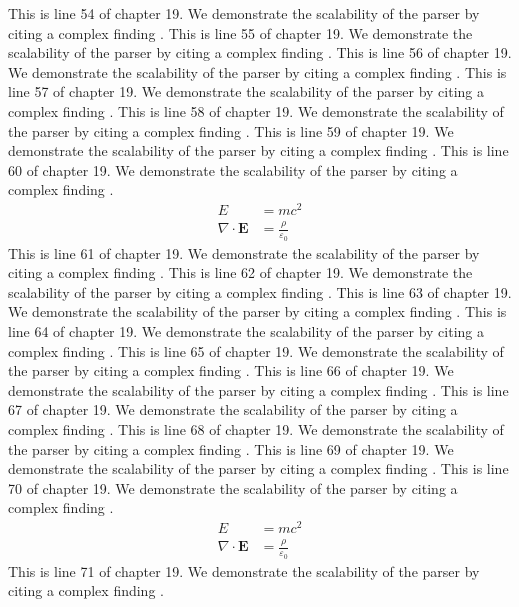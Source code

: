 This is line 54 of chapter 19. We demonstrate the scalability of the parser by citing a complex finding \cite{ref19_54}.
This is line 55 of chapter 19. We demonstrate the scalability of the parser by citing a complex finding \cite{ref19_55}.
This is line 56 of chapter 19. We demonstrate the scalability of the parser by citing a complex finding \cite{ref19_56}.
This is line 57 of chapter 19. We demonstrate the scalability of the parser by citing a complex finding \cite{ref19_57}.
This is line 58 of chapter 19. We demonstrate the scalability of the parser by citing a complex finding \cite{ref19_58}.
This is line 59 of chapter 19. We demonstrate the scalability of the parser by citing a complex finding \cite{ref19_59}.
This is line 60 of chapter 19. We demonstrate the scalability of the parser by citing a complex finding \cite{ref19_60}.
\begin{align*}
  E &= mc^2 \\
  \nabla \cdot \mathbf{E} &= \frac{\rho}{\varepsilon_0}
\end{align*}
This is line 61 of chapter 19. We demonstrate the scalability of the parser by citing a complex finding \cite{ref19_61}.
This is line 62 of chapter 19. We demonstrate the scalability of the parser by citing a complex finding \cite{ref19_62}.
This is line 63 of chapter 19. We demonstrate the scalability of the parser by citing a complex finding \cite{ref19_63}.
This is line 64 of chapter 19. We demonstrate the scalability of the parser by citing a complex finding \cite{ref19_64}.
This is line 65 of chapter 19. We demonstrate the scalability of the parser by citing a complex finding \cite{ref19_65}.
This is line 66 of chapter 19. We demonstrate the scalability of the parser by citing a complex finding \cite{ref19_66}.
This is line 67 of chapter 19. We demonstrate the scalability of the parser by citing a complex finding \cite{ref19_67}.
This is line 68 of chapter 19. We demonstrate the scalability of the parser by citing a complex finding \cite{ref19_68}.
This is line 69 of chapter 19. We demonstrate the scalability of the parser by citing a complex finding \cite{ref19_69}.
This is line 70 of chapter 19. We demonstrate the scalability of the parser by citing a complex finding \cite{ref19_70}.
\begin{align*}
  E &= mc^2 \\
  \nabla \cdot \mathbf{E} &= \frac{\rho}{\varepsilon_0}
\end{align*}
This is line 71 of chapter 19. We demonstrate the scalability of the parser by citing a complex finding \cite{ref19_71}.
